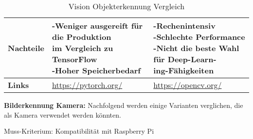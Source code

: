 \begin{table}[H]
\begin{tabularx}{\textwidth}{|l|X|X|}
  \hline
  \textbf{Nachteile} & \makecell{-Weniger ausgereift für die Produktion \\ im Vergleich zu TensorFlow \\ -Hoher Speicherbedarf} & \makecell{-Rechenintensiv \\ -Schlechte Performance \\ -Nicht die beste Wahl für Deep-Learn-\\ing-Fähigkeiten} \\
  \hline
  \textbf{Links} & \url{https://pytorch.org/} & \url{https://opencv.org/} \\
  \hline
\end{tabularx}
\caption{Vision Objekterkennung Vergleich}
\label{table:vision-object-detection-compare}
\end{table}

\newpage

\textbf{Bilderkennung Kamera:} Nachfolgend werden einige Varianten verglichen, die als Kamera verwendet werden könnten.

Muss-Kriterium: Kompatibilität mit Raspberry Pi

